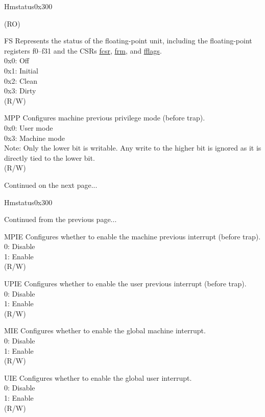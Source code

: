 \begin{register}{H}{mstatus}{0x300}
\begin{regdesc}
\begin{reglist}
(RO) \\
\label{fielddesc:MSTATUS_FS}\item [FS] Represents the status of the floating-point unit, including the floating-point registers f0–f31 and the CSRs \hyperref[regdesc:FCSR]{fcsr}, \hyperref[regdesc:FCSR]{frm}, and \hyperref[regdesc:FFLAGS]{fflags}. \\
0x0: Off\\
0x1: Initial\\
0x2: Clean\\
0x3: Dirty\\
(R/W)
\label{fielddesc:MSTATUSMPP}\item [MPP] Configures machine previous privilege mode (before trap).\\
0x0: User mode\\
0x3: Machine mode\\
Note: Only the lower bit is writable. Any write to the higher bit is ignored as it is directly tied to the lower bit.\\
(R/W)
\item [Continued on the next page...]
\end{reglist}\end{regdesc}
\end{register}
\addtocounter{Regfloat}{-1}
\begin{register}{H}{mstatus}{0x300}
\begin{regdesc}\begin{reglist}
\item [Continued from the previous page...]
\label{fielddesc:MSTATUSMPIE}\item [MPIE] Configures whether to enable the machine previous interrupt (before trap). \\
0: Disable\\
1: Enable\\
(R/W)
\label{fielddesc:MSTATUSUPIE}\item [UPIE] Configures whether to enable the user previous interrupt (before trap). \\
0: Disable\\
1: Enable\\
(R/W)
\label{fielddesc:MSTATUSMIE}\item [MIE] Configures whether to enable the global machine interrupt.\\
0: Disable\\
1: Enable\\
(R/W)
\label{fielddesc:MSTATUSUIE}\item [UIE] Configures whether to enable the global user interrupt.\\
0: Disable\\
1: Enable\\
(R/W)
\end{reglist}\end{regdesc}
\end{register}

